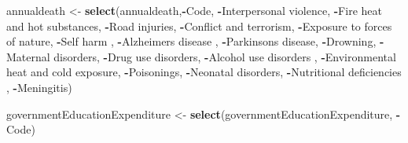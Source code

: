 \documentclass[
]{article}
\newenvironment{Shaded}{\begin{snugshade}}{\end{snugshade}}
\newcommand{\AttributeTok}[1]{\textcolor[rgb]{0.13,0.29,0.53}{#1}}
\newcommand{\FunctionTok}[1]{\textcolor[rgb]{0.13,0.29,0.53}{\textbf{#1}}}
\newcommand{\NormalTok}[1]{#1}
\newcommand{\OtherTok}[1]{\textcolor[rgb]{0.56,0.35,0.01}{#1}}
\newcommand{\SpecialCharTok}[1]{\textcolor[rgb]{0.81,0.36,0.00}{\textbf{#1}}}
\newcommand{\StringTok}[1]{\textcolor[rgb]{0.31,0.60,0.02}{#1}}
\begin{document}
\begin{Shaded}
\begin{Highlighting}[]
\NormalTok{annualdeath }\OtherTok{\textless{}{-}} \FunctionTok{select}\NormalTok{(annualdeath,}\SpecialCharTok{{-}}\NormalTok{Code, }\SpecialCharTok{{-}}\StringTok{\textasciigrave{}}\AttributeTok{Interpersonal violence}\StringTok{\textasciigrave{}}\NormalTok{, }\SpecialCharTok{{-}}\StringTok{\textasciigrave{}}\AttributeTok{Fire heat and hot substances}\StringTok{\textasciigrave{}}\NormalTok{, }\SpecialCharTok{{-}}\StringTok{\textasciigrave{}}\AttributeTok{Road injuries}\StringTok{\textasciigrave{}}\NormalTok{, }\SpecialCharTok{{-}}\StringTok{\textasciigrave{}}\AttributeTok{Conflict and terrorism}\StringTok{\textasciigrave{}}\NormalTok{, }\SpecialCharTok{{-}}\StringTok{\textasciigrave{}}\AttributeTok{Exposure to forces of nature}\StringTok{\textasciigrave{}}\NormalTok{, }\SpecialCharTok{{-}}\StringTok{\textasciigrave{}}\AttributeTok{Self harm}\StringTok{\textasciigrave{}}\NormalTok{ , }\SpecialCharTok{{-}}\StringTok{\textasciigrave{}}\AttributeTok{Alzheimers disease}\StringTok{\textasciigrave{}}\NormalTok{ , }\SpecialCharTok{{-}}\StringTok{\textasciigrave{}}\AttributeTok{Parkinsons disease}\StringTok{\textasciigrave{}}\NormalTok{, }\SpecialCharTok{{-}}\StringTok{\textasciigrave{}}\AttributeTok{Drowning}\StringTok{\textasciigrave{}}\NormalTok{, }\SpecialCharTok{{-}}\StringTok{\textasciigrave{}}\AttributeTok{Maternal disorders}\StringTok{\textasciigrave{}}\NormalTok{, }\SpecialCharTok{{-}}\StringTok{\textasciigrave{}}\AttributeTok{Drug use disorders}\StringTok{\textasciigrave{}}\NormalTok{, }\SpecialCharTok{{-}}\StringTok{\textasciigrave{}}\AttributeTok{Alcohol use disorders}\StringTok{\textasciigrave{}}\NormalTok{ , }\SpecialCharTok{{-}}\StringTok{\textasciigrave{}}\AttributeTok{Environmental heat and cold exposure}\StringTok{\textasciigrave{}}\NormalTok{, }\SpecialCharTok{{-}}\StringTok{\textasciigrave{}}\AttributeTok{Poisonings}\StringTok{\textasciigrave{}}\NormalTok{, }\SpecialCharTok{{-}}\StringTok{\textasciigrave{}}\AttributeTok{Neonatal disorders}\StringTok{\textasciigrave{}}\NormalTok{, }\SpecialCharTok{{-}}\StringTok{\textasciigrave{}}\AttributeTok{Nutritional deficiencies}\StringTok{\textasciigrave{}}\NormalTok{ , }\SpecialCharTok{{-}}\StringTok{\textasciigrave{}}\AttributeTok{Meningitis}\StringTok{\textasciigrave{}}\NormalTok{)}

\NormalTok{governmentEducationExpenditure }\OtherTok{\textless{}{-}} \FunctionTok{select}\NormalTok{(governmentEducationExpenditure, }\SpecialCharTok{{-}}\NormalTok{Code)}


\end{Highlighting}
\end{Shaded}
\end{document}
